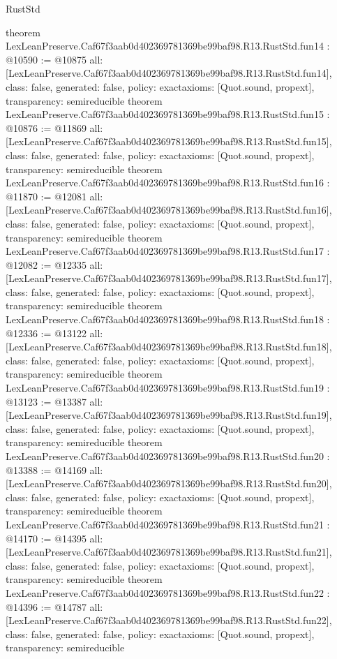 \begin{lexlean}{RustStd}
\begin{coremodule}
{}
theorem LexLeanPreserve.Caf67f3aab0d402369781369be99baf98.R13.RustStd.fun14 : @10590 := @10875 {
  all: [LexLeanPreserve.Caf67f3aab0d402369781369be99baf98.R13.RustStd.fun14],
  class: false,
  generated: false,
  policy: exact{axioms: [Quot.sound, propext]},
  transparency: semireducible
}
theorem LexLeanPreserve.Caf67f3aab0d402369781369be99baf98.R13.RustStd.fun15 : @10876 := @11869 {
  all: [LexLeanPreserve.Caf67f3aab0d402369781369be99baf98.R13.RustStd.fun15],
  class: false,
  generated: false,
  policy: exact{axioms: [Quot.sound, propext]},
  transparency: semireducible
}
theorem LexLeanPreserve.Caf67f3aab0d402369781369be99baf98.R13.RustStd.fun16 : @11870 := @12081 {
  all: [LexLeanPreserve.Caf67f3aab0d402369781369be99baf98.R13.RustStd.fun16],
  class: false,
  generated: false,
  policy: exact{axioms: [Quot.sound, propext]},
  transparency: semireducible
}
theorem LexLeanPreserve.Caf67f3aab0d402369781369be99baf98.R13.RustStd.fun17 : @12082 := @12335 {
  all: [LexLeanPreserve.Caf67f3aab0d402369781369be99baf98.R13.RustStd.fun17],
  class: false,
  generated: false,
  policy: exact{axioms: [Quot.sound, propext]},
  transparency: semireducible
}
theorem LexLeanPreserve.Caf67f3aab0d402369781369be99baf98.R13.RustStd.fun18 : @12336 := @13122 {
  all: [LexLeanPreserve.Caf67f3aab0d402369781369be99baf98.R13.RustStd.fun18],
  class: false,
  generated: false,
  policy: exact{axioms: [Quot.sound, propext]},
  transparency: semireducible
}
theorem LexLeanPreserve.Caf67f3aab0d402369781369be99baf98.R13.RustStd.fun19 : @13123 := @13387 {
  all: [LexLeanPreserve.Caf67f3aab0d402369781369be99baf98.R13.RustStd.fun19],
  class: false,
  generated: false,
  policy: exact{axioms: [Quot.sound, propext]},
  transparency: semireducible
}
theorem LexLeanPreserve.Caf67f3aab0d402369781369be99baf98.R13.RustStd.fun20 : @13388 := @14169 {
  all: [LexLeanPreserve.Caf67f3aab0d402369781369be99baf98.R13.RustStd.fun20],
  class: false,
  generated: false,
  policy: exact{axioms: [Quot.sound, propext]},
  transparency: semireducible
}
theorem LexLeanPreserve.Caf67f3aab0d402369781369be99baf98.R13.RustStd.fun21 : @14170 := @14395 {
  all: [LexLeanPreserve.Caf67f3aab0d402369781369be99baf98.R13.RustStd.fun21],
  class: false,
  generated: false,
  policy: exact{axioms: [Quot.sound, propext]},
  transparency: semireducible
}
theorem LexLeanPreserve.Caf67f3aab0d402369781369be99baf98.R13.RustStd.fun22 : @14396 := @14787 {
  all: [LexLeanPreserve.Caf67f3aab0d402369781369be99baf98.R13.RustStd.fun22],
  class: false,
  generated: false,
  policy: exact{axioms: [Quot.sound, propext]},
  transparency: semireducible
}
\end{coremodule}
\end{lexlean}
